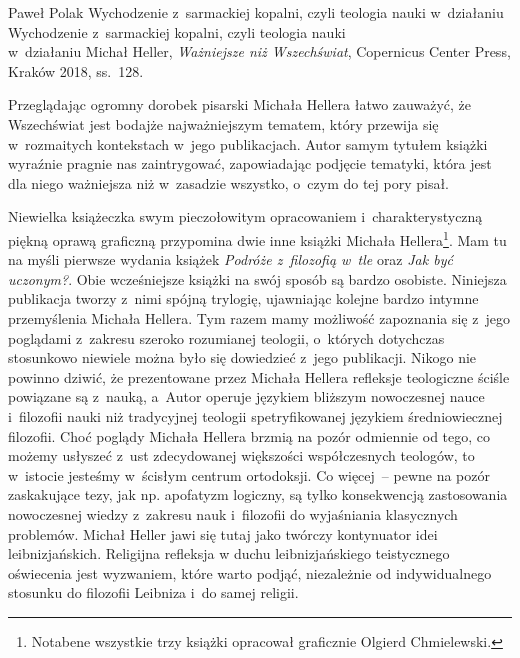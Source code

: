 \begin{recplenv}{Paweł Polak}
	{Wychodzenie z~sarmackiej kopalni, czyli teologia nauki w~działaniu}
	{Wychodzenie z~sarmackiej kopalni, czyli teologia nauki\\w~działaniu}
	{Michał Heller, \textit{Ważniejsze niż Wszechświat}, Copernicus Center Press, Kraków 2018,
		ss.~128.}

\enlargethispage{1\baselineskip}


Przeglądając ogromny dorobek pisarski Michała Hellera łatwo zauważyć, że Wszechświat jest bodajże najważniejszym
tematem, który przewija się w~rozmaitych kontekstach w~jego publikacjach. Autor samym tytułem książki wyraźnie pragnie
nas zaintrygować, zapowiadając podjęcie tematyki, która jest dla niego ważniejsza niż w~zasadzie wszystko, o~czym do
tej pory pisał.

Niewielka książeczka swym pieczołowitym opracowaniem i~charakterystyczną piękną oprawą graficzną przypomina dwie
inne książki Michała Hellera\footnote{Notabene wszystkie trzy książki opracował graficznie Olgierd Chmielewski.}. Mam tu
na myśli pierwsze wydania książek \textit{Podróże z~filozofią w~tle} oraz
\textit{Jak być uczonym?}. Obie wcześniejsze książki na swój sposób są bardzo
osobiste. Niniejsza publikacja tworzy z~nimi spójną trylogię, ujawniając kolejne bardzo intymne przemyślenia Michała
Hellera. Tym razem mamy możliwość zapoznania się z~jego poglądami z~zakresu szeroko rozumianej teologii, o~których
dotychczas stosunkowo niewiele można było się dowiedzieć z~jego publikacji. Nikogo nie powinno dziwić, że prezentowane
przez Michała Hellera refleksje teologiczne ściśle powiązane są z~nauką, a~Autor operuje językiem bliższym nowoczesnej
nauce i~filozofii nauki niż tradycyjnej teologii spetryfikowanej językiem średniowiecznej filozofii. Choć poglądy
Michała Hellera brzmią na pozór odmiennie od tego, co możemy usłyszeć z~ust zdecydowanej większości współczesnych
teologów, to w~istocie jesteśmy w~ścisłym centrum ortodoksji. Co więcej~-- pewne na pozór zaskakujące tezy, jak np.
apofatyzm logiczny, są tylko konsekwencją zastosowania nowoczesnej wiedzy z~zakresu nauk i~filozofii do wyjaśniania
klasycznych problemów. Michał Heller jawi się tutaj jako twórczy kontynuator idei leibnizjańskich. Religijna refleksja
w duchu leibnizjańskiego teistycznego oświecenia jest wyzwaniem, które warto podjąć, niezależnie od indywidualnego
stosunku do filozofii Leibniza i~do samej religii.



\end{recplenv}
